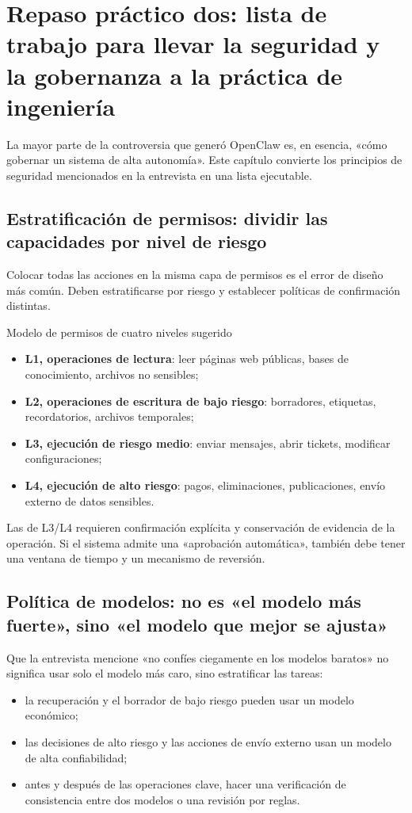 \section{Repaso práctico dos: lista de trabajo para llevar la seguridad y la gobernanza a la práctica de ingeniería}

La mayor parte de la controversia que generó OpenClaw es, en esencia, «cómo gobernar un sistema de alta autonomía». Este capítulo convierte los principios de seguridad mencionados en la entrevista en una lista ejecutable.

\subsection{Estratificación de permisos: dividir las capacidades por nivel de riesgo}

Colocar todas las acciones en la misma capa de permisos es el error de diseño más común. Deben estratificarse por riesgo y establecer políticas de confirmación distintas.

\begin{knowledgebox}{Modelo de permisos de cuatro niveles sugerido}
\begin{itemize}
    \item \textbf{L1, operaciones de lectura}: leer páginas web públicas, bases de conocimiento, archivos no sensibles;
    \item \textbf{L2, operaciones de escritura de bajo riesgo}: borradores, etiquetas, recordatorios, archivos temporales;
    \item \textbf{L3, ejecución de riesgo medio}: enviar mensajes, abrir tickets, modificar configuraciones;
    \item \textbf{L4, ejecución de alto riesgo}: pagos, eliminaciones, publicaciones, envío externo de datos sensibles.
\end{itemize}
\end{knowledgebox}

Las de L3/L4 requieren confirmación explícita y conservación de evidencia de la operación. Si el sistema admite una «aprobación automática», también debe tener una ventana de tiempo y un mecanismo de reversión.

\subsection{Política de modelos: no es «el modelo más fuerte», sino «el modelo que mejor se ajusta»}

Que la entrevista mencione «no confíes ciegamente en los modelos baratos» no significa usar solo el modelo más caro, sino estratificar las tareas:
\begin{itemize}
    \item la recuperación y el borrador de bajo riesgo pueden usar un modelo económico;
    \item las decisiones de alto riesgo y las acciones de envío externo usan un modelo de alta confiabilidad;
    \item antes y después de las operaciones clave, hacer una verificación de consistencia entre dos modelos o una revisión por reglas.
\end{itemize}

